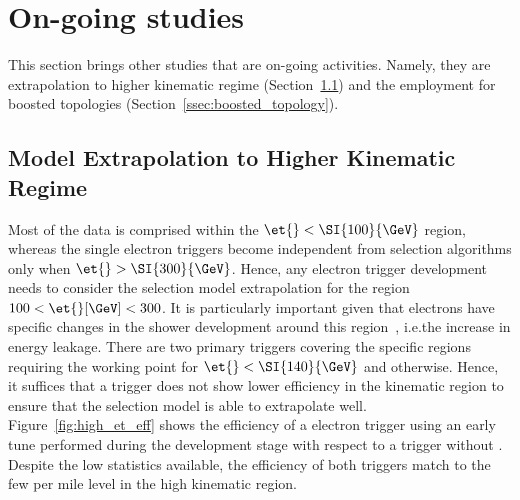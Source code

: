 \chapter{On-going studies}%
\label{sec:other_ana}


This section brings other studies that are on-going activities. Namely, they are
extrapolation to higher kinematic regime
(Section~\ref{ssec:kinematic_extrapolation}) and the \rnn{} employment for
boosted topologies (Section~\ref{ssec:boosted_topology}).

\section{Model Extrapolation to Higher Kinematic Regime}%
\label{ssec:kinematic_extrapolation}


Most of the \Zee{} \tnp{} data is comprised within the $\et{}<\SI{100}{\GeV}$
region, whereas the single electron triggers become independent from
selection algorithms only when $\et{}>\SI{300}{\GeV}$. Hence, any electron trigger
development needs to consider the selection model extrapolation for the region
$100<\et{} [\text{\GeV}]<300$. It is particularly important given that electrons
have specific changes in the shower development around this
region~\cite{atlas_electron_id_offline}, i.e.\@ the increase in \emiii{} energy
leakage. There are two primary triggers covering the specific regions requiring
the \medium{} working point for $\et{}<\SI{140}{\GeV}$ and \vloose{} otherwise.
Hence, it suffices that a \medium{} trigger does not show lower efficiency in
the kinematic region to ensure that the selection model is able to extrapolate
well. Figure~\ref{fig:high_et_eff} shows the efficiency of a \medium{} electron
trigger using an early \rnn{} tune performed during the development stage with
respect to a trigger without \rnn{}. Despite the low statistics available, the
efficiency of both triggers match to the few per mile level in the high
kinematic region.




